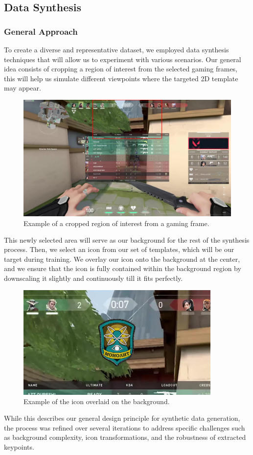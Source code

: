 \subsection{Data Synthesis}
\subsubsection{General Approach}
To create a diverse and representative dataset, we employed data synthesis
techniques that will allow us to experiment with various scenarios. Our general
idea consists of cropping a region of interest from the selected gaming frames,
this will help us simulate different viewpoints where the targeted 2D template
may appear.
\begin{figure}[H]
    \centering
    \includegraphics[width=\textwidth]{ressources/roi.jpg}
    \caption{Example of a cropped region of interest from a gaming frame.}
    \label{fig:roi_example}
\end{figure}
This newly selected area will serve as our background for the rest of the synthesis process. Then, we select an icon from our set of templates, which will be our target during training. We overlay our icon onto the background at the center, and we ensure that the icon is fully contained within the background region by downscaling it slightly and continuously till it fits perfectly.
\begin{figure}[H]
    \centering
    \includegraphics[width=0.9\textwidth]{ressources/image1.jpg}
    \caption{Example of the icon overlaid on the background.}
    \label{fig:overlay_example}
\end{figure}
While this describes our general design principle for synthetic data generation, the process was refined over several iterations to address specific challenges such as background complexity, icon transformations, and the robustness of extracted keypoints.

